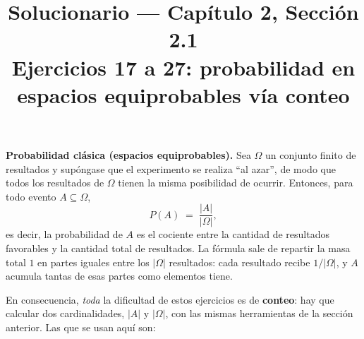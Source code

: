 \documentclass[11pt]{article}
\title{Solucionario --- Cap\'itulo 2, Secci\'on 2.1\\ Ejercicios 17 a 27: probabilidad en espacios equiprobables v\'ia conteo}
\author{}
\date{}
\begin{document}
\maketitle

\begin{teo}
\textbf{Probabilidad cl\'asica (espacios equiprobables).} Sea $\Omega$ un conjunto finito de resultados y sup\'ongase que el experimento se realiza ``al azar'', de modo que todos los resultados de $\Omega$ tienen la misma posibilidad de ocurrir. Entonces, para todo evento $A\subseteq\Omega$,
\[
P(A) \;=\; \frac{|A|}{|\Omega|},
\]
es decir, la probabilidad de $A$ es el cociente entre la cantidad de resultados favorables y la cantidad total de resultados. La f\'ormula sale de repartir la masa total $1$ en partes iguales entre los $|\Omega|$ resultados: cada resultado recibe $1/|\Omega|$, y $A$ acumula tantas de esas partes como elementos tiene.

\medskip
En consecuencia, \emph{toda} la dificultad de estos ejercicios es de \textbf{conteo}: hay que calcular dos cardinalidades, $|A|$ y $|\Omega|$, con las mismas herramientas de la secci\'on anterior. Las que se usan aqu\'i son:


\end{teo}
\end{document}
